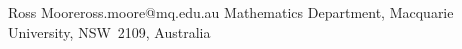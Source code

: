 \ifx\xyloaded\undefined  \fi
{}%
 {Ross Moore}{ross.moore@mq.edu.au}%
 {Mathematics Department, Macquarie University, NSW~2109, Australia}
\xyendinput
